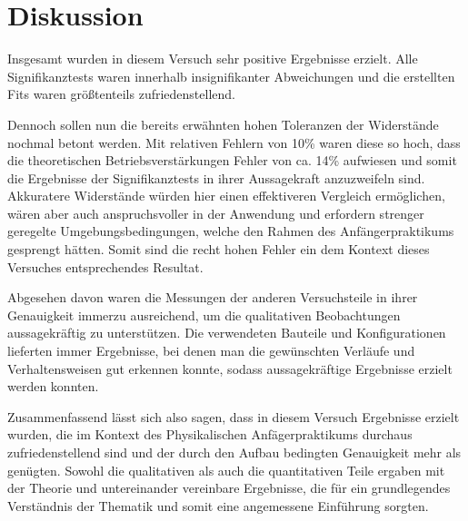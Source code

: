 \documentclass{article}
\newcommand\invisiblesection[1]{%
  \refstepcounter{section}%
  \addcontentsline{toc}{section}{\protect\numberline{\thesection}#1}%
  \sectionmark{#1}\phantom{}}
\begin{document}
\newpage
\section{Diskussion}

Insgesamt wurden in diesem Versuch sehr positive Ergebnisse erzielt. Alle Signifikanztests waren innerhalb insignifikanter Abweichungen und die erstellten Fits waren größtenteils zufriedenstellend. 

Dennoch sollen nun die bereits erwähnten hohen Toleranzen der Widerstände nochmal betont werden. Mit relativen Fehlern von 10\% waren diese so hoch, dass die theoretischen Betriebsverstärkungen Fehler von ca. 14\% aufwiesen und somit die Ergebnisse der Signifikanztests in ihrer Aussagekraft anzuzweifeln sind. Akkuratere Widerstände würden hier einen effektiveren Vergleich ermöglichen, wären aber auch anspruchsvoller in der Anwendung und erfordern strenger geregelte Umgebungsbedingungen, welche den Rahmen des Anfängerpraktikums gesprengt hätten. Somit sind die recht hohen Fehler ein dem Kontext dieses Versuches entsprechendes Resultat. 

Abgesehen davon waren die Messungen der anderen Versuchsteile in ihrer Genauigkeit immerzu ausreichend, um die qualitativen Beobachtungen aussagekräftig zu unterstützen. Die verwendeten Bauteile und Konfigurationen lieferten immer Ergebnisse, bei denen man die gewünschten Verläufe und Verhaltensweisen gut erkennen konnte, sodass aussagekräftige Ergebnisse erzielt werden konnten.

Zusammenfassend lässt sich also sagen, dass in diesem Versuch Ergebnisse erzielt wurden, die im Kontext des Physikalischen Anfägerpraktikums durchaus zufriedenstellend sind und der durch den Aufbau bedingten Genauigkeit mehr als genügten. Sowohl die qualitativen als auch die quantitativen Teile ergaben mit der Theorie und untereinander vereinbare Ergebnisse, die für ein grundlegendes Verständnis der Thematik und somit eine angemessene Einführung sorgten.







 
\newpage


\end{document}
